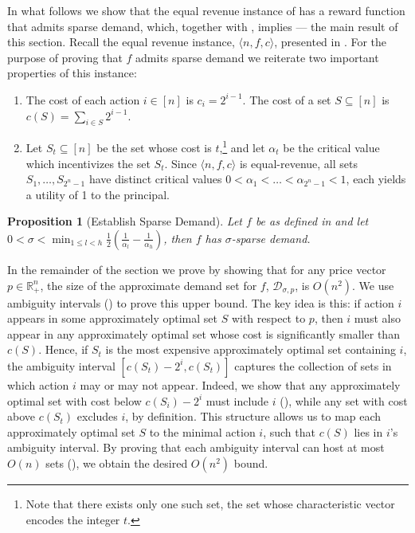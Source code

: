 \documentclass[11pt]{article}
\newtheorem{proposition}{Proposition}
\newcommand{\reals}{\mathbb{R}}
\newcommand{\instance}{\langle n, f, c \rangle}
\newcommand{\demand}[2]{\mathcal{D}_{{#1},{#2}}}
\newcommand{\demSigP}{\demand{\sigma}{p}}
\begin{document}
In what follows we show that the equal revenue instance of  has a reward function that admits sparse demand, which, together with , implies  --- the main result of this section. Recall the equal revenue instance, $\instance$, presented in . 
For the purpose of proving that $f$ admits sparse demand we reiterate two important properties of this instance:
\begin{enumerate}
    \setlength\itemsep{-0.25em}
    \item The cost of each action $i \in [n]$ is $c_i = 2^{i-1}$. The cost of a set $S \subseteq [n]$ is $ c(S)= \sum_{i \in S} 2^{i-1}$.
    \item Let $S_t \subseteq [n]$ be the set whose cost is $t$,\footnote{Note that there exists only one such set, the set whose characteristic vector encodes the integer $t$.} and let $\alpha_t$ be the critical value which incentivizes the set $S_t$. 
    Since $\instance$ is equal-revenue, all sets $S_1,\dots,S_{2^n-1}$ have distinct critical values $0<\alpha_1 < \dots < \alpha_{2^n-1}<1$, each yields a utility of 1 to the principal.
\end{enumerate}

\begin{proposition}[Establish Sparse Demand]\label{prop:BoundApproxDemand}
    Let $f$ be as defined in  and let $0 < \sigma < \min_{1 \le l < h} \frac{1}{2}\left(\frac{1}{\alpha_l} - \frac{1}{\alpha_h}\right)$, then
    $f$ has $\sigma$-sparse demand. 
\end{proposition}

In the remainder of the section we prove  by showing that for any price vector $p \in \reals_{+}^n$, the size of the approximate demand set for $f$, $\demSigP$, is $O(n^2)$.
We use ambiguity intervals () to prove this upper bound. 
The key idea is this: 
if action $i$ appears in some approximately optimal set $S$ with respect to $p$, then $i$ must also appear in any approximately optimal set whose cost is significantly smaller than $c(S)$.
Hence, if $S_t$ is the most expensive approximately optimal set containing $i$, the ambiguity interval $[c(S_t) - 2^i, c(S_t)]$ captures the collection of sets in which action $i$ may or may not appear. Indeed, we show that any approximately optimal set with cost below $c(S_i) - 2^i$ must include $i$ (), while any set with cost above $c(S_t)$ excludes $i$, by definition. 
This structure allows us to map each approximately optimal set $S$ to the minimal action $i$, such that $c(S)$ lies in $i$’s ambiguity interval. By proving that each ambiguity interval can host at most $O(n)$ sets (), we obtain the desired $O(n^2)$ bound.
\end{document}
